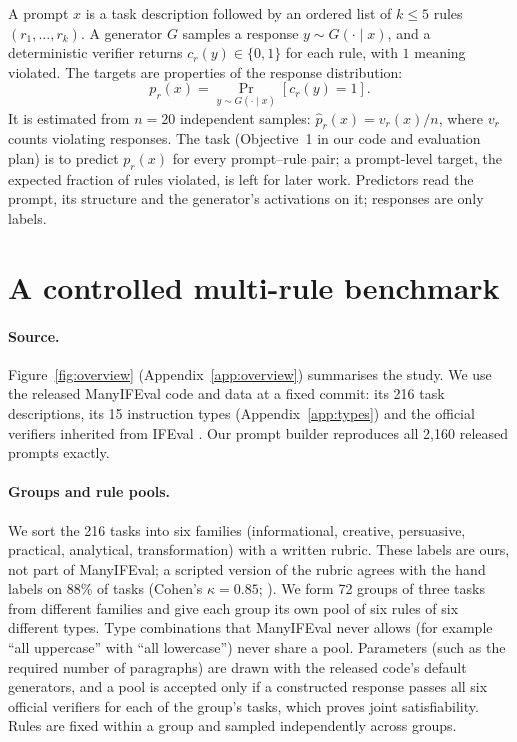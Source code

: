 \documentclass{article}
\newcommand{\phat}{\hat{p}}
\begin{document}
A prompt $x$ is a task description followed by an ordered list of $k\le 5$ rules $(r_1,\dots,r_k)$. A generator $G$
samples a response $y\sim G(\cdot\mid x)$, and a deterministic verifier returns $c_r(y)\in\{0,1\}$ for each rule, with
$1$ meaning violated. The targets are properties of the response distribution:
\begin{equation}
p_r(x)=\Pr_{y\sim G(\cdot\mid x)}\!\left[c_r(y)=1\right].
\label{eq:targets}
\end{equation}
It is estimated from $n=20$ independent samples: $\phat_r(x)=v_r(x)/n$, where $v_r$ counts violating responses. The task (Objective~1 in our code and evaluation plan) is to predict $p_r(x)$ for every prompt--rule pair; a prompt-level target, the expected fraction of rules violated, is left for later work. Predictors read the prompt, its structure and the generator's activations on it; responses are only labels.

\section{A controlled multi-rule benchmark}
\label{sec:data}



\paragraph{Source.} Figure~\ref{fig:overview} (Appendix~\ref{app:overview}) summarises the study. We use the released ManyIFEval code and data \citep{harada2025instructions} at a fixed commit: its
216 task descriptions, its 15 instruction types (Appendix~\ref{app:types}) and the official verifiers inherited from
IFEval \citep{zhou2023ifeval}. Our prompt builder reproduces all 2,160 released prompts exactly.

\paragraph{Groups and rule pools.} We sort the 216 tasks into six families (informational, creative, persuasive,
practical, analytical, transformation) with a written rubric. These labels are ours, not part of ManyIFEval; a
scripted version of the rubric agrees with the hand labels on 88\% of tasks (Cohen's $\kappa=0.85$;
\citealp{landis1977kappa}). We form 72 groups of three tasks from different families and give each group its own
pool of six rules of six different types. Type combinations that ManyIFEval never allows (for example ``all
uppercase'' with ``all lowercase'') never share a pool. Parameters (such as the required number of paragraphs) are
drawn with the released code's default generators, and a pool is accepted only if a constructed response passes all
six official verifiers for each of the group's tasks, which proves joint satisfiability. Rules are fixed within a
group and sampled independently across groups.
\end{document}
